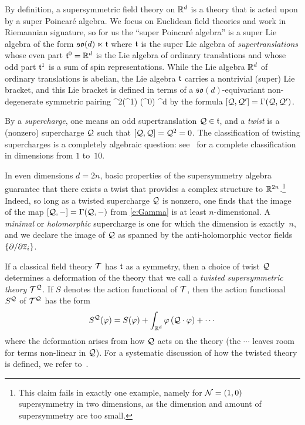 \documentclass[11pt]{amsart}
\begin{document}
By definition, a supersymmetric field theory on $\mathbb R^d$ is a theory that is acted upon by a super Poincar\'{e} algebra. 
We focus on Euclidean field theories and work in Riemannian signature,
so for us the ``super Poincar\'{e} algebra'' is a super Lie algebra of the form
$\mathfrak{so}(d) \ltimes \mathfrak t$
where $\mathfrak t$ is the super Lie algebra of {\em supertranslations} whose even part $\mathfrak t^0 = \mathbb R^d$ is the Lie algebra of ordinary translations and whose odd part $\mathfrak t^1$ is a sum of spin representations. 
While the Lie algebra $\mathbb R^d$ of ordinary translations is abelian, the Lie algebra $\mathfrak t$ carries a nontrivial (super) Lie bracket,
and this Lie bracket is defined in terms of a $\mathfrak{so}(d)$-equivariant non-degenerate symmetric pairing
\beqn
\label{e:Gamma}
\Gamma {}^2(\ft^{1}) (\ft^0) \cong \RR^d 
\eeqn
by the formula $[\mathcal Q, \mathcal Q'] = \Gamma(\mathcal Q, \mathcal Q')$. 

By a {\em supercharge}, one means an odd supertranslation $\mathcal Q \in \mathfrak t$, and
a {\em twist} is a (nonzero) supercharge $\mathcal Q$ such that $[\mathcal Q,\mathcal Q] = \mathcal Q^2 = 0$. 
The classification of twisting supercharges is a completely algebraic question:
see~\autocite{EllSaf} for a complete classification in dimensions from $1$ to~$10$.

In even dimensions $d = 2n$, basic properties of the supersymmetry algebra guarantee that there exists a twist that provides a complex structure to $\mathbb R^{2n}$.\footnote{This claim fails in exactly one example, namely for $\mathcal N=(1,0)$ supersymmetry in two dimensions, as the dimension and amount of supersymmetry are too small.}
Indeed, so long as a twisted supercharge $\mathcal Q$ is nonzero, 
one finds that the image of the map $[\mathcal Q,-] = \Gamma(\mathcal Q,-)$ from \eqref{e:Gamma} is at least $n$-dimensional.
A {\em minimal} or {\em holomorphic} supercharge is one for which the dimension is exactly~$n$,
and we declare the image of $\mathcal Q$ as spanned by the anti-holomorphic vector fields~$\{\partial / \partial {\overline{z}}_i\}$. 

If a classical field theory $\mathcal T$ has $\mathfrak t$ as a symmetry, 
then a choice of twist $\mathcal Q$ determines a deformation of the theory that we call a {\em twisted supersymmetric theory} $\mathcal T^\mathcal Q$.
If $S$ denotes the action functional of $\mathcal T$, then the action functional $S^\mathcal Q$ of $\mathcal T^\mathcal Q$ has the form
\[
S^\mathcal Q(\varphi) = S(\varphi) + \int_{\mathbb R^d} \varphi  \left(\mathcal Q \cdot \varphi \right) + \cdots 
\]
where the deformation arises from how $\mathcal Q$ acts on the theory 
(the $\cdots$ leaves room for terms non-linear in $\mathcal Q$).
For a systematic discussion of how the twisted theory is defined, 
we refer to~\autocite{CosSUSY, ESW}. 
\end{document}
